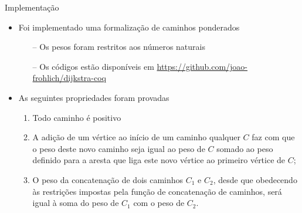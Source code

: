 \begin{frame}{Implementação}
    \begin{itemize}
        \item Foi implementado uma formalização de caminhos ponderados
        \begin{itemize}
            \item [--] Os pesos foram restritos aos números naturais
            \item [--] Os códigos estão disponíveis em \url{https://github.com/joao-frohlich/dijkstra-coq}
        \end{itemize}
        \item As seguintes propriedades foram provadas
        \begin{enumerate}
            \item Todo caminho é positivo
            \item A adição de um vértice ao início de um caminho qualquer $C$ faz com que o peso deste novo caminho seja igual ao peso de
            $C$ somado ao peso definido para a aresta que liga este novo vértice ao primeiro vértice de $C$;
            \item O peso da concatenação de dois caminhos $C_1$ e $C_2$, desde que obedecendo às restrições impostas pela função de
            concatenação de caminhos, será igual à soma do peso de $C_1$ com o peso de $C_2$.
        \end{enumerate}
    \end{itemize}
\end{frame}